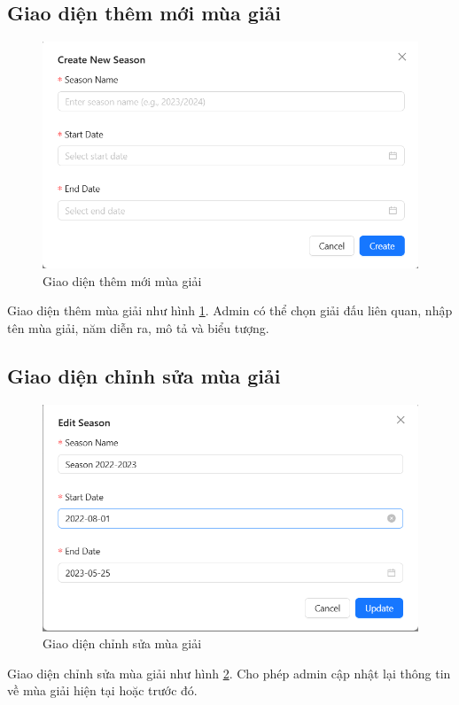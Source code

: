 \documentclass[../BTL.tex]{subfiles}
\begin{document}
\subsection{Giao diện thêm mới mùa giải}
\begin{figure}
    \centering
    \includegraphics[width=1\linewidth]{Hinhve/admin_add_season.png}
    \caption{Giao diện thêm mới mùa giải}
    \label{fig:admin_add_season}
\end{figure}
Giao diện thêm mùa giải như hình \ref{fig:admin_add_season}. Admin có thể chọn giải đấu liên quan, nhập tên mùa giải, năm diễn ra, mô tả và biểu tượng.

\subsection{Giao diện chỉnh sửa mùa giải}
\begin{figure}
    \centering
    \includegraphics[width=1\linewidth]{Hinhve/admin_edit_season.png}
    \caption{Giao diện chỉnh sửa mùa giải}
    \label{fig:admin_edit_season}
\end{figure}
Giao diện chỉnh sửa mùa giải như hình \ref{fig:admin_edit_season}. Cho phép admin cập nhật lại thông tin về mùa giải hiện tại hoặc trước đó.
\end{document}
